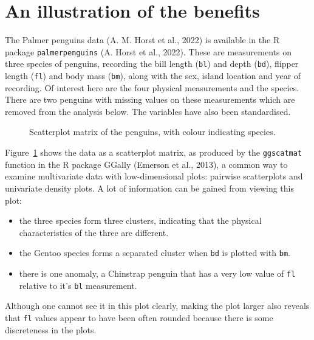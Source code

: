 \documentclass[
  letterpaper,
]{krantz}
\providecommand{\tightlist}{%
  \setlength{\itemsep}{0pt}\setlength{\parskip}{0pt}}\usepackage{longtable,booktabs,array}
\begin{document}
\section{An illustration of the
benefits}\label{an-illustration-of-the-benefits}

The Palmer penguins data (A. M. Horst et al., 2022) is available in the
R package \texttt{palmerpenguins} (A. Horst et al., 2022). These are
measurements on three species of penguins, recording the bill length
(\texttt{bl}) and depth (\texttt{bd}), flipper length (\texttt{fl}) and
body mass (\texttt{bm}), along with the sex, island location and year of
recording. Of interest here are the four physical measurements and the
species. There are two penguins with missing values on these
measurements which are removed from the analysis below. The variables
have also been standardised. 

\begin{figure}


\caption{\label{fig-penguins-scatmat}Scatterplot matrix of the penguins,
with colour indicating species.}

\end{figure}%

Figure~\ref{fig-penguins-scatmat} shows the data as a scatterplot
matrix, as produced by the \texttt{ggscatmat} function in the R package
GGally (Emerson et al., 2013), a common way to examine multivariate data
with low-dimensional plots: pairwise scatterplots and univariate density
plots. A lot of information can be gained from viewing this plot:

\begin{itemize}
\tightlist
\item
  the three species form three clusters, indicating that the physical
  characteristics of the three are different.
\item
  the Gentoo species forms a separated cluster when \texttt{bd} is
  plotted with \texttt{bm}.
\item
  there is one anomaly, a Chinstrap penguin that has a very low value of
  \texttt{fl} relative to it's \texttt{bl} measurement.
\end{itemize}

Although one cannot see it in this plot clearly, making the plot larger
also reveals that \texttt{fl} values appear to have been often rounded
because there is some discreteness in the plots.
\end{document}
